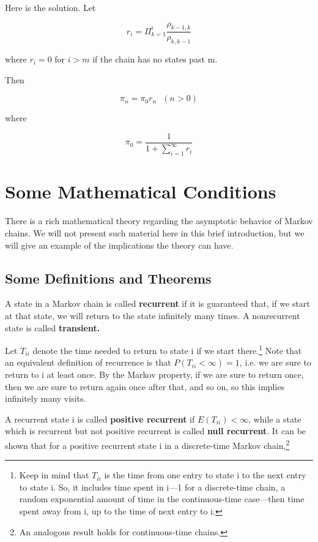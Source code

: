 \documentclass[11pt]{article}
\begin{document}
Here is the solution. Let

\begin{equation}
r_{i}=\Pi ^{i}_{k=1}\frac{\rho_{k-1,k}}{\rho_{k,k-1}}
\end{equation}

where $r_i = 0$ for $i > m$ if the chain has no states past m.

Then

\begin{equation}
\pi_{n}=\pi_{0}r_{n}\textrm{ }(n>0)
\end{equation}

where

\begin{equation}
\pi_{0}=\frac{1}{1+\sum ^{\infty }_{i=1}r_{i}}
\end{equation}  

\section{Some Mathematical Conditions}

There is a rich mathematical theory regarding the asymptotic behavior of
Markov chains. We will not present such material here in this brief
introduction, but we will give an example of the implications the theory
can have.

\subsection{Some Definitions and Theorems}

A state in a Markov chain is called \textbf{recurrent} if it is
guaranteed that, if we start at that state, we will return to the state
infinitely many times.  A nonrecurrent state is called
\textbf{transient.} 

Let $T_{ii}$ denote the time needed to return to state i if we start
there.\footnote{Keep in mind that $T_{ii}$ is the time from one entry to
state i to the next entry to state i.  So, it includes time spent in
i---1 for a discrete-time chain, a random exponential amount of time in
the continuous-time case---then time spent away from i, up to the time
of next entry to i.} Note that an equivalent definition of recurrence is
that $P(T_{ii}<\infty )=1$, i.e. we are sure to return to i at least
once.  By the Markov property, if we are sure to return once, then we
are sure to return again once after that, and so on, so this implies
infinitely many visits.

A recurrent state i is called \textbf{positive recurrent} if
$E(T_{ii})<\infty$, while a state which is recurrent but not positive
recurrent is called \textbf{null recurrent}. It can be shown that for a
positive recurrent state i in a discrete-time Markov chain,\footnote{An
analogous result holds for continuous-time chains.}
\end{document}
